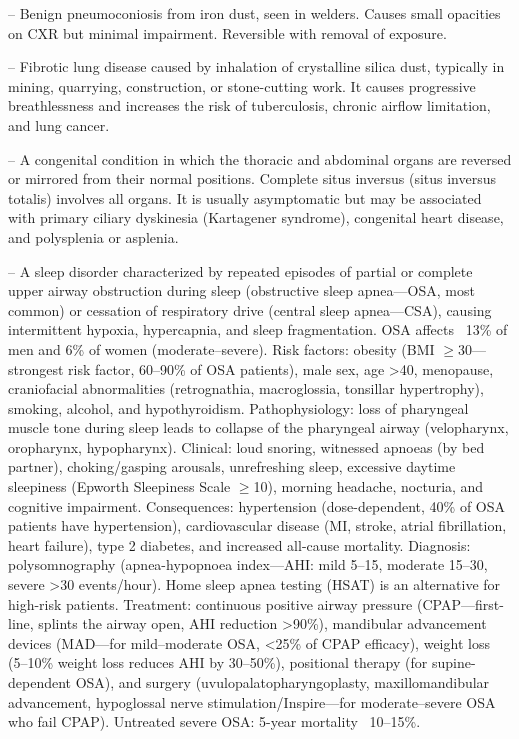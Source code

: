 -- Benign pneumoconiosis from iron dust, seen in welders. Causes small opacities on CXR but minimal impairment. Reversible with removal of exposure.

-- Fibrotic lung disease caused by inhalation of crystalline silica dust, typically in mining, quarrying, construction, or stone-cutting work. It causes progressive breathlessness and increases the risk of tuberculosis, chronic airflow limitation, and lung cancer.

-- A congenital condition in which the thoracic and abdominal organs are reversed or mirrored from their normal positions. Complete situs inversus (situs inversus totalis) involves all organs. It is usually asymptomatic but may be associated with primary ciliary dyskinesia (Kartagener syndrome), congenital heart disease, and polysplenia or asplenia.

-- A sleep disorder characterized by repeated episodes of partial or complete upper airway obstruction during sleep (obstructive sleep apnea—OSA, most common) or cessation of respiratory drive (central sleep apnea—CSA), causing intermittent hypoxia, hypercapnia, and sleep fragmentation. OSA affects ~13\% of men and 6\% of women (moderate--severe). Risk factors: obesity (BMI \(\ge\)30—strongest risk factor, 60--90\% of OSA patients), male sex, age >40, menopause, craniofacial abnormalities (retrognathia, macroglossia, tonsillar hypertrophy), smoking, alcohol, and hypothyroidism. Pathophysiology: loss of pharyngeal muscle tone during sleep leads to collapse of the pharyngeal airway (velopharynx, oropharynx, hypopharynx). Clinical: loud snoring, witnessed apnoeas (by bed partner), choking/gasping arousals, unrefreshing sleep, excessive daytime sleepiness (Epworth Sleepiness Scale \(\ge\)10), morning headache, nocturia, and cognitive impairment. Consequences: hypertension (dose-dependent, 40\% of OSA patients have hypertension), cardiovascular disease (MI, stroke, atrial fibrillation, heart failure), type 2 diabetes, and increased all-cause mortality. Diagnosis: polysomnography (apnea-hypopnoea index—AHI: mild 5--15, moderate 15--30, severe >30 events/hour). Home sleep apnea testing (HSAT) is an alternative for high-risk patients. Treatment: continuous positive airway pressure (CPAP—first-line, splints the airway open, AHI reduction >90\%), mandibular advancement devices (MAD—for mild--moderate OSA, <25\% of CPAP efficacy), weight loss (5--10\% weight loss reduces AHI by 30--50\%), positional therapy (for supine-dependent OSA), and surgery (uvulopalatopharyngoplasty, maxillomandibular advancement, hypoglossal nerve stimulation/Inspire—for moderate--severe OSA who fail CPAP). Untreated severe OSA: 5-year mortality ~10--15\%.

